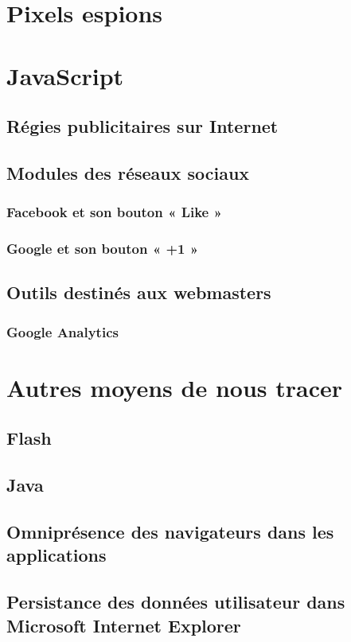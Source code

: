 
\section{Pixels espions}
\section{JavaScript}
	\subsection{Régies publicitaires sur Internet}
		
	\subsection{Modules des réseaux sociaux}
		
		\subsubsection{Facebook et son bouton « Like »}
			
		\subsubsection{Google et son bouton « +1 »}
			
	\subsection{Outils destinés aux webmasters}
		
		\subsubsection{Google Analytics}

\section{Autres moyens de nous tracer}
	\subsection{Flash}
	
	\subsection{Java}
	
	\subsection{Omniprésence des navigateurs dans les applications}
		
	\subsection{Persistance des données utilisateur dans Microsoft Internet Explorer}
		

